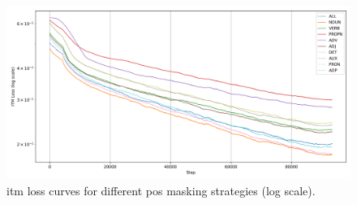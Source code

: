 \begin{figure}[H]
    \centering
    \includegraphics[width=\textwidth]{Images/graph/itm.png}
    \caption{\acrshort{itm} loss curves for different \acrshort{pos} masking strategies (log scale).}
    \label{fig:itm_loss_pretrain}
\end{figure}




